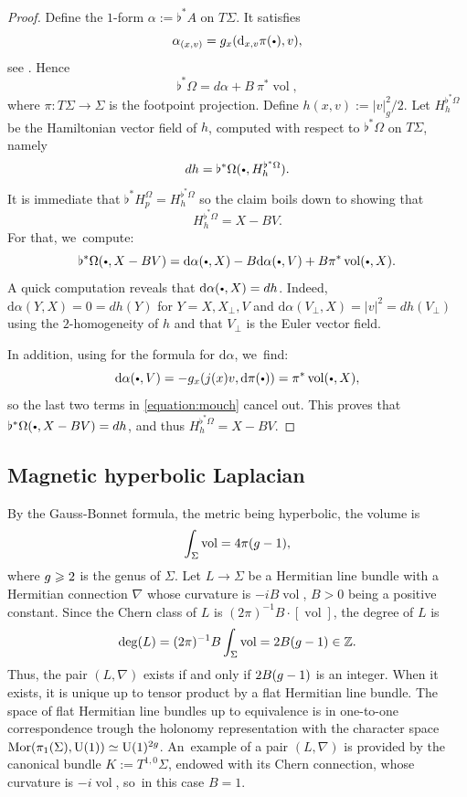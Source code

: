 \documentclass[10pt,a4paper]{amsart}
\newcommand{\sbullet}{{\scriptscriptstyle\bullet}}
\newcommand{\csbullet}{{\raisebox{1pt}{$\sbullet$}}}
\theoremstyle{plain}
\theoremstyle{definition}
\let\op\operatorname
\newcommand{\Z}{\mathbb{Z}}
\let\Si\Sigma
\newcommand{\dd}{\mathrm{d}}
\DeclareMathOperator{\vol}{vol}
\begin{document}
\begin{proof}
Define the $1$-form $\alpha := \flat^*A$ on $T\Sigma$. It satisfies
\[
\alpha_{(x,v)} = g_x(\dd_{x,v}\pi(\csbullet),v),
\]
see \cite[Lem.\,1.37, item\,1]{Paternain-99}. Hence
\[
\flat^*\Omega = d\alpha + B~ \pi^*\vol,
\]
where $\pi : T\Sigma \to \Sigma$ is the footpoint projection. Define $h(x,v) := |v|^2_g/2$. Let $H_h^{\flat^*\Omega}$ be the Hamiltonian vector field of $h$, computed with respect to $\flat^*\Omega$ on $T\Sigma$, namely
\[
dh = \flat^*\Omega(\csbullet, H_h^{\flat^*\Omega}).
\]
It is immediate that $\flat^* H_p^{\Omega} = H_h^{\flat^*\Omega}$ so the claim boils down to showing that
\[
H_h^{\flat^*\Omega} = X - B V.
\]
For that, we~compute:
\begin{equation}
\label{equation:mouch}
\flat^*\Omega(\csbullet,X-BV) = \dd\alpha(\csbullet, X) - B \dd \alpha(\csbullet, V) + B \pi^*\vol(\csbullet, X).
\end{equation}
A quick computation reveals that $\dd \alpha(\csbullet, X) = dh$. Indeed, $\dd \alpha(Y,X) = 0 = dh(Y)$ for $Y = X,X_\perp,V$ and $\dd \alpha(V_\perp,X) = |v|^2 = dh(V_\perp)$ using the $2$-homogeneity of $h$ and that $V_\perp$ is the Euler vector field.

In addition, using \cite[Prop.\,1.24]{Paternain-99} for the formula for $\dd \alpha$, we~find:
\[
\dd \alpha(\csbullet,V) = - g_x(j(x)v, \dd \pi(\csbullet)) = \pi^*\vol(\csbullet,X),
\]
so the last two terms in \eqref{equation:mouch} cancel out. This proves that $\flat^*\Omega(\csbullet,X-BV) = dh$, and thus $H_h^{\flat^*\Omega} = X - B V$.
\end{proof}
\subsection{Magnetic hyperbolic Laplacian} \label{ssection:landau} By the Gauss-Bonnet formula, the metric being
hyperbolic, the volume is
\begin{equation}
\int_{\Si} \vol = 4 \pi (\textsl{g} -1),
\end{equation}
where $\textsl{g}\geqslant
2 $ is the genus of $\Si$. Let $L \to \Sigma$ be a Hermitian line bundle with
a Hermitian connection
$\nabla$ whose curvature is $-i B \op{vol}
$, $B > 0$ being a positive constant. Since the Chern class of $L$ is $ (2
\pi)^{-1} B \cdot [ \op{vol}]$, the
degree of $L$ is
\begin{equation}
\label{equation:deg}
\mathrm{deg}(L) = (2 \pi)^{-1} B \int_{\Si} \vol = 2 B (\textsl{g}-1) \in \Z.
\end{equation}
Thus, the pair $(L,
\nabla)$ exists if and only if $2 B (\textsl{g}-1)$ is an integer. When it exists, it
is unique up to tensor product by a flat Hermitian line bundle. The
space of flat Hermitian line bundles up to equivalence is in one-to-one
correspondence trough the holonomy representation with the character space
$\op{Mor} (\pi_1 (\Si), \op{U}(1)) \simeq \op{U} (1)^{2\textsl{g}}$. An~example of a pair $(L, \nabla)$ is provided by the canonical bundle $K := T^{1,0} \Si$,
endowed with its Chern connection, whose curvature is $- i \vol$, so~in this
case $B=1$.
\end{document}
